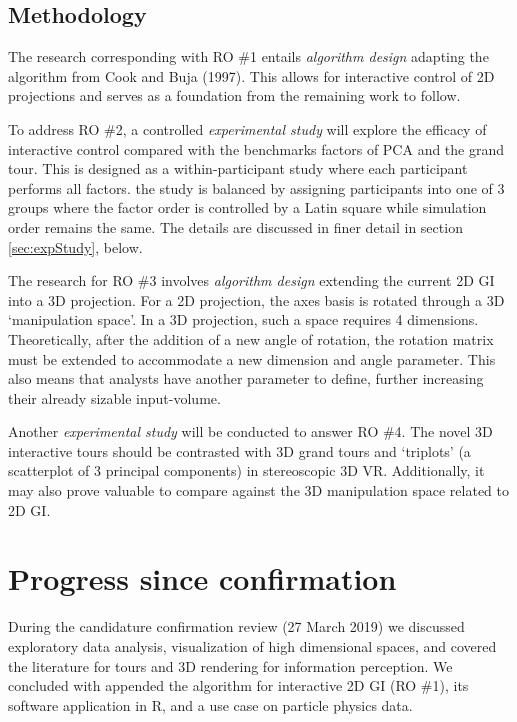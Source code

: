 \documentclass[
  11,
]{article}
\begin{document}
\hypertarget{methodology}{%
\subsection{Methodology}\label{methodology}}

The research corresponding with RO \#1 entails \emph{algorithm design} adapting the algorithm from Cook and Buja (1997). This allows for interactive control of 2D projections and serves as a foundation from the remaining work to follow.

To address RO \#2, a controlled \emph{experimental study} will explore the efficacy of interactive control compared with the benchmarks factors of PCA and the grand tour. This is designed as a within-participant study where each participant performs all factors. the study is balanced by assigning participants into one of 3 groups where the factor order is controlled by a Latin square while simulation order remains the same. The details are discussed in finer detail in section \ref{sec:expStudy}, below.

The research for RO \#3 involves \emph{algorithm design} extending the current 2D GI into a 3D projection. For a 2D projection, the axes basis is rotated through a 3D `manipulation space'. In a 3D projection, such a space requires 4 dimensions. Theoretically, after the addition of a new angle of rotation, the rotation matrix must be extended to accommodate a new dimension and angle parameter. This also means that analysts have another parameter to define, further increasing their already sizable input-volume.

Another \emph{experimental study} will be conducted to answer RO \#4. The novel 3D interactive tours should be contrasted with 3D grand tours and `triplots' (a scatterplot of 3 principal components) in stereoscopic 3D VR. Additionally, it may also prove valuable to compare against the 3D manipulation space related to 2D GI.

\hypertarget{progress-since-confirmation}{%
\section{Progress since confirmation}\label{progress-since-confirmation}}

During the candidature confirmation review (27 March 2019) we discussed exploratory data analysis, visualization of high dimensional spaces, and covered the literature for tours and 3D rendering for information perception. We concluded with appended the algorithm for interactive 2D GI (RO \#1), its software application in R, and a use case on particle physics data.
\end{document}
